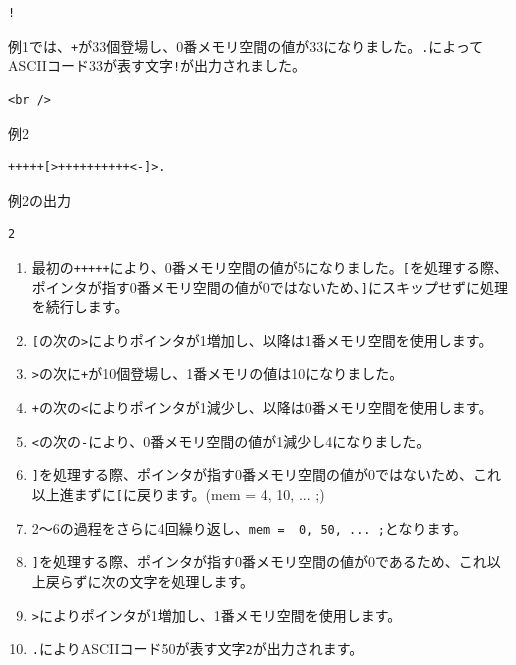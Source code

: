 \begin{lstlisting}
!
\end{lstlisting}

例1では、\texttt{+}が33個登場し、0番メモリ空間の値が33になりました。\texttt{.}によってASCIIコード33が表す文字\texttt{!}が出力されました。

\begin{lstlisting}
<br />
\end{lstlisting}

例2

\begin{lstlisting}
+++++[>++++++++++<-]>.
\end{lstlisting}

例2の出力

\begin{lstlisting}
2
\end{lstlisting}
\begin{enumerate}
\item 
最初の\texttt{+++++}により、0番メモリ空間の値が5になりました。\texttt{[}を処理する際、ポインタが指す0番メモリ空間の値が0ではないため、\texttt{]}にスキップせずに処理を続行します。


\item 
\texttt{[}の次の\texttt{>}によりポインタが1増加し、以降は1番メモリ空間を使用します。


\item 
\texttt{>}の次に\texttt{+}が10個登場し、1番メモリの値は10になりました。


\item 
\texttt{+}の次の\texttt{<}によりポインタが1減少し、以降は0番メモリ空間を使用します。


\item 
\texttt{<}の次の\texttt{-}により、0番メモリ空間の値が1減少し4になりました。


\item 
\texttt{]}を処理する際、ポインタが指す0番メモリ空間の値が0ではないため、これ以上進まずに\texttt{[}に戻ります。(mem = { 4, 10, ... };)


\item 
2〜6の過程をさらに4回繰り返し、\texttt{mem = { 0, 50, ... };}となります。


\item 
\texttt{]}を処理する際、ポインタが指す0番メモリ空間の値が0であるため、これ以上戻らずに次の文字を処理します。


\item 
\texttt{>}によりポインタが1増加し、1番メモリ空間を使用します。


\item 
\texttt{.}によりASCIIコード50が表す文字\texttt{2}が出力されます。


\end{enumerate}
